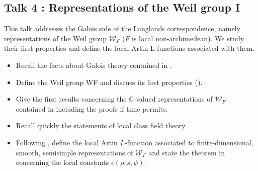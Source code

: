 \documentclass[11pt]{amsart}
\newcommand{\C}{\mathbb{C}}
\begin{document}
\subsection{Talk 4 : Representations of the Weil group I}
This talk addresses the Galois side of the Langlands correspondence, namely representations
of the Weil group $\mathcal{W}_F$ ($F$ is local non-archimedean). We study their first properties and define the local Artin L-functions
associated with them.
\begin{itemize}
    \item Recall the facts about Galois theory contained in \cite[\S 28.1-28.3]{BH06}.
    \item Define the Weil group WF and discuss its first properties (\cite[\S 28.4-28.5]{BH06}).
    \item Give the first results concerning the $\C$-valued representations of $\mathcal{W}_F$ contained in \cite[\S 28.6-28.7]{BH06} including the proofs if time permits.
    \item Recall quickly the statements of local class field theory \cite[\S 29.1]{BH06}
    \item Following \cite[\S 29.2-29.4]{BH06}, define the local Artin $L$-function associated to finite-dimensional, smooth, semisimple representations of $\mathcal{W}_F$ and state the theorem in \cite[\S 29.4]{BH06} concerning the local constants $\epsilon(\rho,s,\psi)$.
\end{itemize}






\end{document}
